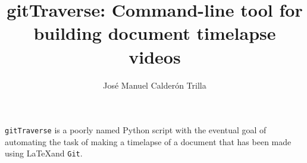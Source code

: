 \documentclass{article}
\title{gitTraverse: Command-line tool for building document timelapse videos}
\author{Jos\'{e} Manuel Calder\'{o}n Trilla}
\begin{document}
\verb=gitTraverse= is a poorly named Python script with the eventual goal of automating
the task of making a timelapse of a document that has been made using \LaTeX and
\verb=Git=.
\end{document}
